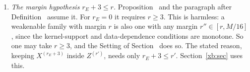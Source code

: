 \begin{detail}
\begin{enumerate}[label=(\alph*)]
\begin{itemize}
  \item Here ``touch'' means that the closed cubes of the continuum filled by two boxes share a point. The boxes themselves, as sets of lattice points, are disjoint.
  \end{itemize}
\item \emph{The margin hypothesis $r_E+3\le r$.} Proposition~ and the paragraph after Definition~ assume it. For $r_E=0$ it requires $r\ge3$. This is harmless: a weakenable family with margin $r$ is also one with any margin $r''\in[r,M/16]$, since the kernel-support and data-dependence conditions are monotone. So one may take $r\ge3$, and the Setting of Section~ does so. The stated reason, keeping $X^{(r_E+3)}$ inside $Z^{(r')}$, needs only $r_E+3\le r'$. Section~\ref{xb:sec} uses this.
\end{enumerate}
\end{detail}

